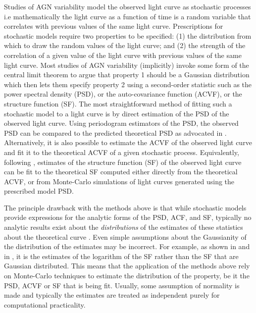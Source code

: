 \documentclass[a4paper,fleqn,usenatbib]{mnras}
\begin{document}
Studies of AGN variability model the observed light curve as stochastic processes i.e mathematically the light curve as a function of time is a random variable that correlates with previous values of the same light curve. Prescriptions for stochastic models require two properties to be specified: (1) the distribution from which to draw the random values of the light curve; and (2) the strength of the correlation of a given value of the light curve with previous values of the same light curve. Most studies of AGN variability (implicitly) invoke some form of the central limit theorem to argue that property 1 should be a Gaussian distribution which then lets them specify property 2 using a second-order statistic such as the power spectral density (PSD), or the auto-covariance function (ACVF), or the structure function (SF). The most straightforward method of fitting such a stochastic model to a light curve is by direct estimation of the PSD of the observed light curve. Using periodogram estimators of the PSD, the observed PSD can be compared to the predicted theoretical PSD as advocated in \citet*{Uttley02}. Alternatively, it is also possible to estimate the ACVF of the observed light curve and fit it to the theoretical ACVF of a given stochastic process. Equivalently, following \citet*{Kasliwal15}, estimates of the structure function (SF) of the observed light curve can be fit to the theoretical SF computed either directly from the theoretical ACVF, or from Monte-Carlo simulations of light curves generated using the prescribed model PSD.

The principle drawback with the methods above is that while stochastic models provide expressions for the analytic forms of the PSD, ACF, and SF, typically no analytic results exist about the \textit{distributions} of the estimates of these statistics about the theoretical curve \citep{BrockwellDavisITSF}. Even simple assumptions about the Gaussianity of the distribution of the estimates may be incorrect. For example, as shown in \citet*{Emm10} and in \citet{Kasliwal15}, it is the estimates of the logarithm of the SF rather than the SF that are Gaussian distributed. This means that the application of the methods above rely on Monte-Carlo techniques to estimate the distribution of the property, be it the PSD, ACVF or SF that is being fit. Usually, some assumption of normality is made and typically the estimates are treated as independent purely for computational practicality.
\end{document}
